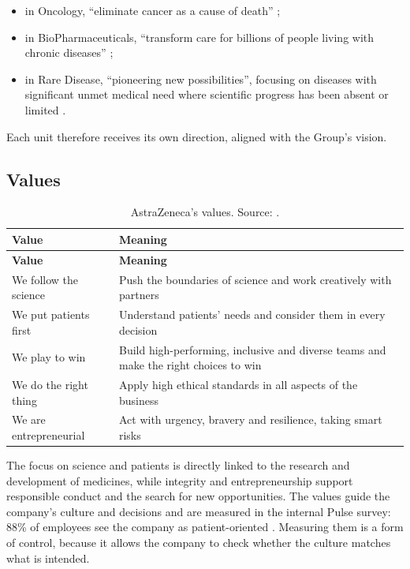 \begin{itemize}
  \item in Oncology, ``eliminate cancer as a cause of death'' \cite[p.~14]{AR};
  \item in BioPharmaceuticals, ``transform care for billions of people living with chronic diseases'' \cite[p.~16]{AR};
  \item in Rare Disease, ``pioneering new possibilities'', focusing on diseases with significant unmet medical need where scientific progress has been absent or limited \cite[p.~22]{AR}.
\end{itemize}

Each unit therefore receives its own direction, aligned with the Group's vision.

\subsection{Values}

\begin{xltabular}{\linewidth}{@{}lY@{}}
\caption{AstraZeneca's values. Source: \cite[p.~8]{AR}.}\label{tab:valores}\\*
\toprule
\textbf{Value} & \textbf{Meaning} \\*
\midrule
\endfirsthead
\toprule
\textbf{Value} & \textbf{Meaning} \\*
\midrule
\endhead
\bottomrule
\endfoot
We follow the science & Push the boundaries of science and work creatively with partners \\
We put patients first & Understand patients' needs and consider them in every decision \\
We play to win & Build high-performing, inclusive and diverse teams and make the right choices to win \\
We do the right thing & Apply high ethical standards in all aspects of the business \\
We are entrepreneurial & Act with urgency, bravery and resilience, taking smart risks \\
\end{xltabular}

The focus on science and patients is directly linked to the research and development of medicines, while integrity and entrepreneurship support responsible conduct and the search for new opportunities. The values guide the company's culture and decisions and are measured in the internal Pulse survey: 88\% of employees see the company as patient-oriented \cite[p.~38]{AR}. Measuring them is a form of control, because it allows the company to check whether the culture matches what is intended.

